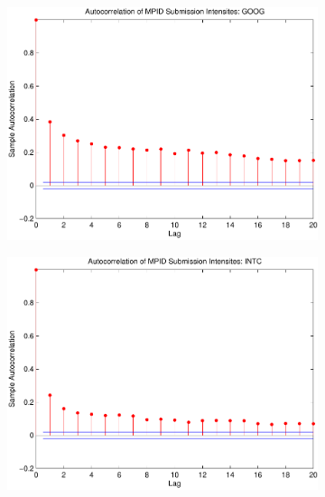 \documentclass{article}
\begin{document}
\begin{figure}[htp!]
\begin{subfigure}{0.24\textwidth}
\includegraphics[width=\linewidth]{docs/Graphs_MPID_SUB_RATIO_GOOG_30sec_FullTime.pdf}
\end{subfigure}
\hspace*{\fill}
\begin{subfigure}{0.24\textwidth}
\includegraphics[width=\linewidth]{docs/Graphs_MPID_SUB_RATIO_INTC_30sec_FullTime.pdf}
\end{subfigure}
\begin{subfigure}{0.24\textwidth}

\end{subfigure}
\end{figure}
\end{document}
